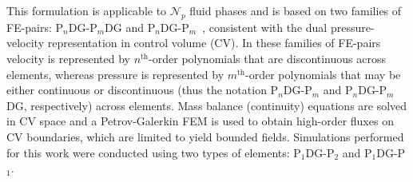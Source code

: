 \documentclass[preprint,authoryear,12pt]{elsarticle}
\newcommand{\PN}[2][error]{P$_{#1}$DG-P$_{#2}$}
\newcommand{\PNDG}[2][error]{P$_{#1}$DG-P$_{#2}$DG}
\begin{document}
\medskip
This formulation is applicable to $\mathcal{N}_{p}$ fluid phases and is based on two families of  FE-pairs: \PNDG[n]{m} and \PN[n]{m}~\citep{cotter_2009a}, consistent with the dual pressure-velocity representation in control volume (CV). In these families of FE-pairs velocity is represented by $n^{\text{th}}$-order polynomials that are discontinuous across elements, whereas pressure is represented by $m^{\text{th}}$-order polynomials that may be either continuous or discontinuous (thus the notation \PN[n]{m} and \PNDG[n]{m}, respectively) across elements. Mass balance (continuity) equations are solved in CV space and a Petrov-Galerkin FEM is used to obtain high-order fluxes on CV boundaries, which are limited to yield bounded fields. Simulations performed for this work were conducted using two types of elements: \PN[1]{2} and \PN[1]{1}. %

 

\end{document}

